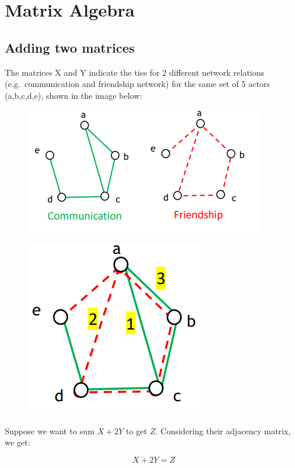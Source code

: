 \documentclass[
  notitlepage,
  onecolumn,
  openany]{book}
\begin{document}
\hypertarget{matrix-algebra}{%
\section{Matrix Algebra}\label{matrix-algebra}}

\hypertarget{adding-two-matrices}{%
\subsection{Adding two matrices}\label{adding-two-matrices}}

The matrices X and Y indicate the ties for 2 different network relations (e.g.~communication and friendship network) for the same set of 5 actors (a,b,c,d,e), shown in the image below:

\begin{figure}[h!]

{\centering \includegraphics[width=0.4\linewidth]{images/05-Matrices and Beta centrality/Untitled} 

}

\end{figure}

\begin{figure}[h!]

{\centering \includegraphics[width=0.25\linewidth]{images/05-Matrices and Beta centrality/Untitled 1} 

}

\end{figure}

Suppose we want to sum \(X+2Y\) to get \(Z\). Considering their adjacency matrix, we get:

\[
X+2Y = Z
\]
\end{document}
